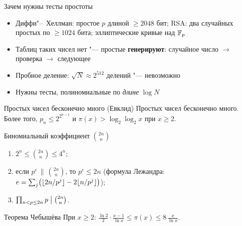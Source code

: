 \documentclass{ca-slides}
\author{}
\begin{document}
\titleframe

\begin{canvasframe}{Зачем нужны тесты простоты}
  \begin{itemize}
    \item Диффи"--~Хеллман: простое $p$ длиной $\ge 2048$ бит; RSA: два случайных простых
      по $\ge 1024$ бита; эллиптические кривые над $\mathbb{F}_{p}$
    \item Таблиц таких чисел нет "--- простые \textbf{генерируют}: случайное число $\to$
      проверка $\to$ следующее
    \item Пробное деление: $\sqrt N \approx 2^{512}$ делений "--- невозможно
    \item Нужны тесты, полиномиальные по \emph{длине} $\log N$
  \end{itemize}
\end{canvasframe}

\begin{theoremframe}{Простых чисел бесконечно много}
  (Евклид) Простых чисел бесконечно много. Более того, $p_n \le 2^{2^{n-1}}$ и
  $\pi(x) > \log_2 \log_2 x$ при $x \ge 2$.
\end{theoremframe}

\begin{canvasframe}{Биномиальный коэффициент $\binom{2n}{n}$}
  \small
  \begin{lemma}
    \begin{enumerate}
      \item $2^n \le \binom{2n}{n} \le 4^n$;
      \item если $p^e \,\|\, \binom{2n}{n}$, то $p^e \le 2n$ \quad
        (формула Лежандра: $e = \sum_j \bigl(\lfloor2n/p^j\rfloor - 2\lfloor n/p^j\rfloor\bigr)$);
      \item $\prod_{n < p \le 2n} p \bigm| \binom{2n}{n}$.
    \end{enumerate}
  \end{lemma}
  \proofarea[0.05\textheight]
\end{canvasframe}

\begin{theoremframe}{Теорема Чебышёва}
  При $x \ge 2$:\quad
  $\displaystyle \frac{\ln 2}{2} \cdot \frac{x - 1}{\ln x} \le \pi(x) \le 8\,\frac{x}{\ln x}$.
\end{theoremframe}
\end{document}

